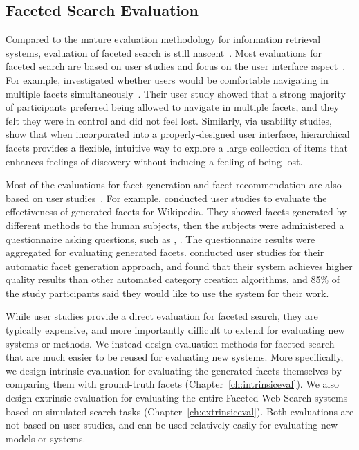 \subsection{Faceted Search Evaluation}
Compared to the mature evaluation methodology for information retrieval systems, evaluation of faceted search is still nascent~\cite{wilson2009bridging,tunkelang2009faceted}. Most evaluations for faceted search are based on user studies and focus on the user interface aspect~\cite{burke1996knowledge,english2002hierarchical,hearst2006design,yee2003faceted,hearst2008uis,kules2009exploratory}.
For example, \citet{english2002hierarchical} investigated whether users would be comfortable navigating in multiple facets simultaneously~\cite{english2002hierarchical}. Their user study showed that a strong majority of participants preferred being allowed to navigate in multiple facets, and they felt they were in control and did not feel lost. Similarly, via usability studies, \citet{yee2003faceted} show that when incorporated into a properly-designed user interface, hierarchical facets provides a flexible, intuitive way to explore a large collection of items that enhances feelings of discovery without inducing a feeling of being lost.

Most of the evaluations for facet generation and facet recommendation are also based on user studies~\cite{li2010facetedpedia,stoica2007automating}. For example, \citet{li2010facetedpedia} conducted user studies to evaluate the effectiveness of generated facets for Wikipedia. They showed facets generated by different methods to the human subjects, then the subjects were administered a questionnaire asking questions, such as , . The questionnaire results were aggregated for evaluating generated facets. \citet{stoica2007automating} conducted user studies for their automatic facet generation approach, and found that their system achieves higher quality results than other automated category creation algorithms, and 85\% of the study participants said they would like to use the system for their work.

While user studies provide a direct evaluation for faceted search, they are typically expensive, and more importantly difficult to extend for evaluating new systems or methods. We instead design evaluation methods for faceted search that are much easier to be reused for evaluating new systems. More specifically, we design intrinsic evaluation for evaluating the generated facets themselves by comparing them with ground-truth facets (Chapter~\ref{ch:intrinsiceval}). We also design extrinsic evaluation for evaluating the entire Faceted Web Search systems based on simulated search tasks (Chapter~\ref{ch:extrinsiceval}). Both evaluations are not based on user studies, and can be used relatively easily for evaluating new models or systems.
 
